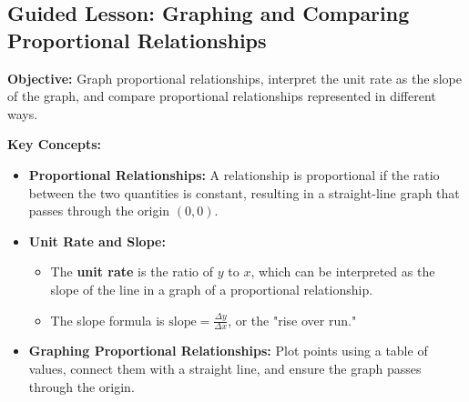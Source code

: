\documentclass[12pt]{article}
\title{}
\date{}
\begin{document}
\subsection*{Guided Lesson: Graphing and Comparing Proportional Relationships}
\onehalfspacing

\begin{tcolorbox}[colframe=black!40, colback=gray!5, 
coltitle=black, colbacktitle=black!20, fonttitle=\bfseries\Large, 
title=Learning Objective, halign title=center, left=5pt, right=5pt, top=5pt, bottom=15pt]
\textbf{Objective:} Graph proportional relationships, interpret the unit rate as the slope of the graph, and compare proportional relationships represented in different ways.
\end{tcolorbox}

\vspace{1em}

\begin{tcolorbox}[colframe=black!60, colback=white, 
coltitle=black, colbacktitle=black!15, fonttitle=\bfseries\Large, 
title=Key Concepts and Vocabulary, halign title=center, left=10pt, right=10pt, top=10pt, bottom=15pt]
\textbf{Key Concepts:}
\begin{itemize}
    \item \textbf{Proportional Relationships:} A relationship is proportional if the ratio between the two quantities is constant, resulting in a straight-line graph that passes through the origin \((0, 0)\).
    \item \textbf{Unit Rate and Slope:}
    \begin{itemize}
        \item The \textbf{unit rate} is the ratio of \(y\) to \(x\), which can be interpreted as the slope of the line in a graph of a proportional relationship.
        \item The slope formula is \(\text{slope} = \frac{\Delta y}{\Delta x}\), or the "rise over run."
    \end{itemize}
    \item \textbf{Graphing Proportional Relationships:} Plot points using a table of values, connect them with a straight line, and ensure the graph passes through the origin.
\end{itemize}
\end{tcolorbox}

\vspace{1em}
\end{document}
